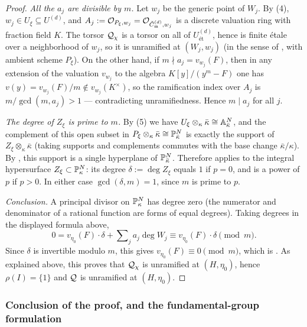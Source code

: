 \begin{proof}
    \emph{All the $a_j$ are divisible by $m$.} Let $w_j$ be the generic point of $W_j$. By
    (4), $w_j \in U_\xi \subseteq U^{(d)}$, and
    $A_j := \mathcal{O}_{P_\xi, w_j} = \mathcal{O}_{\tilde{C}_{\mathfrak{m}}^{(d)}, w_j}$ is a discrete valuation ring with fraction
    field $K$. The torsor $\mathcal{Q}_\chi$ is a torsor on all of $U^{(d)}_{\text{\'et}}$, hence is
    finite \'etale over a neighborhood of $w_j$, so it is unramified at $(W_j, w_j)$ (in the
    sense of , with ambient scheme $P_\xi$). On
    the other hand, if $m \nmid a_j = v_{w_j}(F)$, then in any extension of the valuation
    $v_{w_j}$ to the algebra $K[y]/(y^m - F)$ one has
    $v(y) = v_{w_j}(F)/m \notin v_{w_j}(K^\times)$, so the ramification index over $A_j$ is
    $m/\gcd(m, a_j) > 1$ --- contradicting unramifiedness. Hence $m \mid a_j$ for all $j$.

    \emph{The degree of $Z_\xi$ is prime to $m$.} By
    (5) we have
    $U_\xi \otimes_\kappa \bar{\kappa} \cong \mathbb{A}^N_{\bar\kappa}$, and the complement of this
    open subset in $P_\xi \otimes_\kappa \bar{\kappa} \cong \mathbb{P}^N_{\bar\kappa}$ is exactly the
    support of $Z_\xi \otimes_\kappa \bar{\kappa}$ (taking supports and complements commutes
    with the base change $\bar\kappa/\kappa$). By ,
    this support is a single hyperplane of $\mathbb{P}^N_{\bar\kappa}$. Therefore
     applies to the integral hypersurface
    $Z_\xi \subset \mathbb{P}^N_\kappa$: its degree $\delta := \deg Z_\xi$ equals $1$ if $p = 0$, and
    is a power of $p$ if $p > 0$. In either case $\gcd(\delta, m) = 1$, since $m$ is prime to
    $p$.

    \emph{Conclusion.} A principal divisor on $\mathbb{P}^N_\kappa$ has degree zero (the numerator
    and denominator of a rational function are forms of equal degrees). Taking degrees in the
    displayed formula above,
    \[ 0 = v_{\eta_0}(F)\cdot \delta + \sum\nolimits_j a_j \deg W_j
         \equiv v_{\eta_0}(F) \cdot \delta \pmod{m}. \]
    Since $\delta$ is invertible modulo $m$, this gives
    $v_{\eta_0}(F) \equiv 0 \pmod{m}$, which is
    . As explained above, this proves that
    $\mathcal{Q}_\chi$ is unramified at $(H, \eta_0)$, hence $\rho(I) = \{1\}$ and $\mathcal{Q}$ is unramified
    at $(H, \eta_0)$.
\end{proof}

\subsubsection*{Conclusion of the proof, and the fundamental-group formulation}

